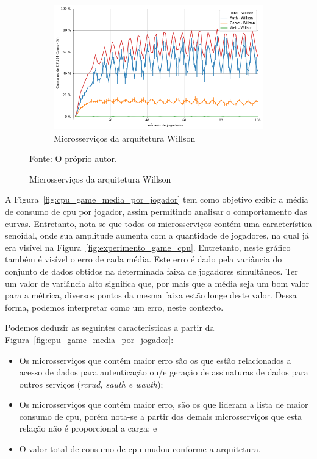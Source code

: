 \begin{figure}[htb!]
    \begin{subfigure}{0.5\textwidth}
        \centering
        \includegraphics[width=.95\linewidth]{figuras/analise/cpu_w_arch_media_por_jogador.png}
        \caption{Microsserviços da arquitetura Willson}
        \label{fig:cpu_w_arch_media_por_jogador}
    \end{subfigure}%

    Fonte: O próprio autor.
\end{figure}

A Figura~\ref{fig:cpu_game_media_por_jogador} tem como objetivo exibir a média de consumo de \ac{cpu} por jogador, assim permitindo analisar o comportamento das curvas.
%
Entretanto, nota-se que todos os microsserviços contém uma característica senoidal, onde sua amplitude aumenta com a quantidade de jogadores, na qual já era visível na Figura~\ref{fig:experimento_game_cpu}.
%
Entretanto, neste gráfico também é visível o erro de cada média.
%
Este erro é dado pela variância do conjunto de dados obtidos na determinada faixa de jogadores simultâneos.
%
Ter um valor de variância alto significa que, por mais que a média seja um bom valor para a métrica, diversos pontos da mesma faixa estão longe deste valor.
%
Dessa forma, podemos interpretar como um erro, neste contexto.

Podemos deduzir as seguintes características a partir da Figura~\ref{fig:cpu_game_media_por_jogador}:

\begin{itemize}
 \item Os microsserviços que contém maior erro são os que estão relacionados a acesso de dados para autenticação ou/e geração de assinaturas de dados para outros serviços (\textit{rcrud, sauth e wauth});
 \item Os microsserviços que contém maior erro, são os que lideram a lista de maior consumo de \ac{cpu}, porém nota-se a partir dos demais microsserviços que esta relação não é proporcional a carga; e
 \item O valor total de consumo de \ac{cpu} mudou conforme a arquitetura.
\end{itemize}

